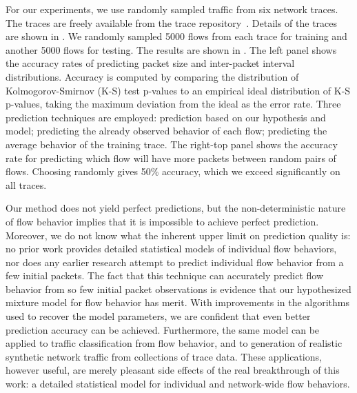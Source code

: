 \documentclass{acm_proc_article-sp}
\begin{document}
For our experiments, we use randomly sampled traffic from six network traces.
The traces are freely available from the  trace repository~\cite{Yeo06}.
Details of the traces are shown in .
We randomly sampled 5000 flows from each trace for training and another 5000 flows for testing.
The results are shown in .
The left panel shows the accuracy rates of predicting packet size and inter-packet interval distributions.
Accuracy is computed by comparing the distribution of Kolmogorov-Smirnov (K-S) test p-values to an empirical ideal distribution of K-S p-values, taking the maximum deviation from the ideal as the error rate.
Three prediction techniques are employed:
prediction based on our hypothesis and model;
predicting the already observed behavior of each flow;
predicting the average behavior of the training trace.
The right-top panel shows the accuracy rate for predicting which flow will have more packets between random pairs of flows.
Choosing randomly gives 50\% accuracy, which we exceed significantly on all traces.

Our method does not yield perfect predictions, but the non-deterministic nature of flow behavior implies that it is impossible to achieve perfect prediction.
Moreover, we do not know what the inherent upper limit on prediction quality is:
no prior work provides detailed statistical models of individual flow behaviors, nor does any earlier research attempt to predict individual flow behavior from a few initial packets.
The fact that this technique can accurately predict flow behavior from so few initial packet observations is evidence that our hypothesized mixture model for flow behavior has merit.
With improvements in the algorithms used to recover the model parameters, we are confident that even better prediction accuracy can be achieved.
Furthermore, the same model can be applied to traffic classification from flow behavior, and to generation of realistic synthetic network traffic from collections of trace data.
These applications, however useful, are merely pleasant side effects of the real breakthrough of this work:
a detailed statistical model for individual and network-wide flow behaviors.

\renewcommand{\thesection}{\textsection}
\vspace{-0.15em}
\scriptsize


\end{document}
